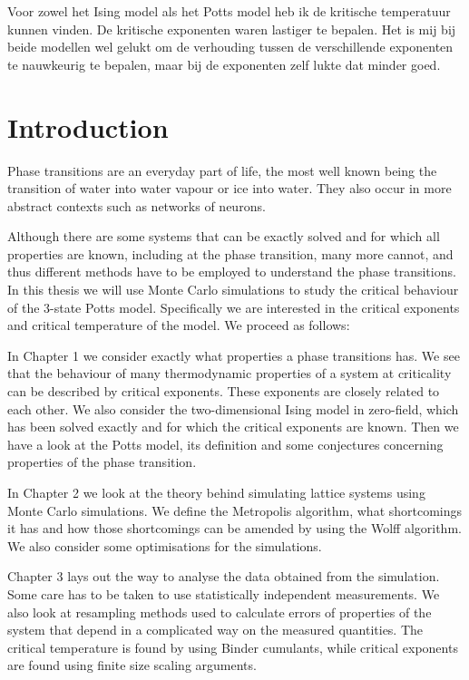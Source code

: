 \documentclass[11pt, a4paper]{report} %
\begin{document}
Voor zowel het Ising model als het Potts model heb ik de kritische temperatuur kunnen vinden.
De kritische exponenten waren lastiger te bepalen.
Het is mij bij beide modellen wel gelukt om de verhouding tussen de verschillende exponenten te nauwkeurig te bepalen, maar bij de exponenten zelf lukte dat minder goed.



\tableofcontents

\chapter*{Introduction}
Phase transitions are an everyday part of life, the most well known being the transition of water into water vapour or ice into water.
They also occur in more abstract contexts such as networks of neurons.\cite{tkacik:2015}

Although there are some systems that can be exactly solved and for which all properties are known, including at the phase transition, many more cannot, and thus different methods have to be employed to understand the phase transitions.
In this thesis we will use Monte Carlo simulations to study the critical behaviour of the 3-state Potts model.
Specifically we are interested in the critical exponents and critical temperature of the model.
We proceed as follows:

In Chapter 1 we consider exactly what properties a phase transitions has.
We see that the behaviour of many thermodynamic properties of a system at criticality can be described by critical exponents.
These exponents are closely related to each other.
We also consider the two-dimensional Ising model in zero-field, which has been solved exactly and for which the critical exponents are known.
Then we have a look at the Potts model, its definition and some conjectures concerning properties of the phase transition.

In Chapter 2 we look at the theory behind simulating lattice systems using Monte Carlo simulations.
We define the Metropolis algorithm, what shortcomings it has and how those shortcomings can be amended by using the Wolff algorithm.
We also consider some optimisations for the simulations.

Chapter 3 lays out the way to analyse the data obtained from the simulation.
Some care has to be taken to use statistically independent measurements.
We also look at resampling methods used to calculate errors of properties of the system that depend in a complicated way on the measured quantities.
The critical temperature is found by using Binder cumulants, while critical exponents are found using finite size scaling arguments.
\end{document}
